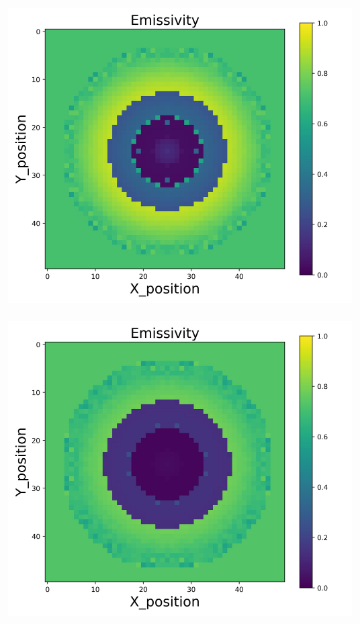 \begin{figure}[p]
\begin{minipage}{\textwidth}
\begin{subfigure}{0.325\textwidth}
        \end{subfigure}
        \begin{subfigure}{0.325\textwidth}
            \centering
            \includegraphics[width=\textwidth]{figures/raw_data/23/linear/emi_cal.jpg}
        \end{subfigure}
        \begin{subfigure}{0.325\textwidth}
            \centering
            \includegraphics[width=\textwidth]{figures/raw_data/24/linear/emi_cal.jpg}

\end{subfigure}
\end{minipage}
\end{figure}
